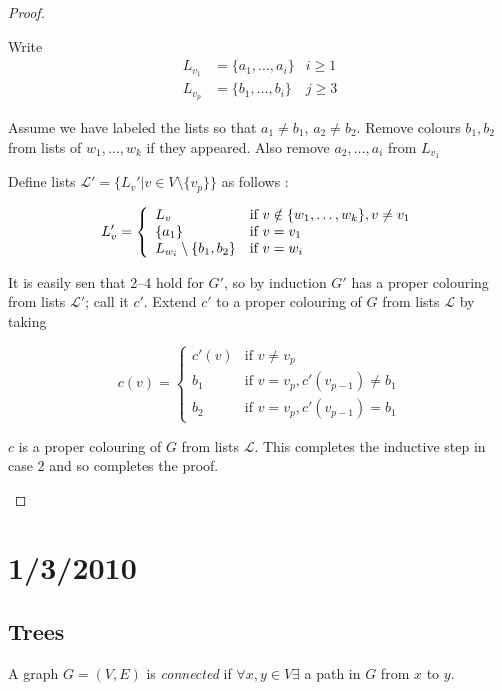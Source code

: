 \documentclass{article}
\begin{document}
\begin{proof}
\begin{itemize}
\begin{itemize}
Write 
\begin{align*}
L_{v_1} &= \{a_1, \ldots, a_i\} & i \ge 1 \\
L_{v_p} &= \{b_1, \ldots, b_i\} & j \ge 3 
\end{align*}

Assume we have labeled the lists so that $a_1 \neq b_1$, $a_2 \neq b_2$.  Remove colours $b_1, b_2$ from lists of $w_1, \ldots, w_k$ if they appeared.  Also remove $a_2, \ldots, a_i$ from $L_{v_1}$

Define lists $\mathcal{L}'= \{L_v' | v \in V \setminus \{v_p\}\}$ as follows :

\[ L_v' = \left\{ \begin{array}{l l}
L_v & \text{if } v \notin \{w_1, \ldots, w_k\}, v \neq v_1 \\
\{a_1\} & \text{if } v = v_1\\
L_{w_i}\setminus \{b_1, b_2\} & \text{if } v = w_i
\end{array} \right.
\]

It is easily sen that 2--4 hold for $G'$, so by induction $G'$ has a proper colouring from lists $\mathcal{L}'$; call it $c'$.  Extend $c'$ to a proper colouring of $G$ from lists $\mathcal{L}$ by taking

\[
c(v) = \left\{ \begin{array}{ll}
c'(v) & \text{if } v \neq v_p \\
b_1 & \text{if } v=v_p, c'(v_{p-1}) \neq b_1 \\
b_2 & \text{if } v=v_p, c'(v_{p-1}) = b_1
\end{array} \right.
\]

$c$ is a proper colouring of $G$ from lists $\mathcal{L}$.  This completes the inductive step in case 2 and so completes the proof.
\end{itemize}
\end{itemize}
\end{proof}
\section*{1/3/2010}

\subsection*{Trees}
\begin{defn}
A graph $G=(V,E)$ is \emph{connected} if $\forall x, y \in V \exists$ a path in $G$ from $x$ to $y$.
\end{defn}
\end{document}
